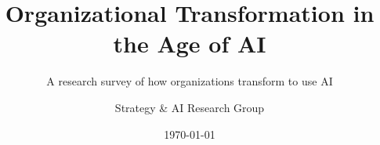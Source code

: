 \documentclass[11pt]{article}
\title{Organizational Transformation in the Age of AI}
\subtitle{A research survey of how organizations transform to use AI}
\author{Strategy \& AI Research Group}
\date{\today}
\begin{document}


\twocolumn






\end{document}
